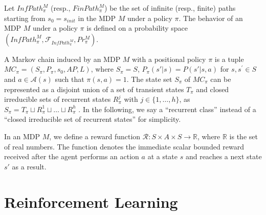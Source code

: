 \documentclass[a4j,12pt,oneside,openany,english,dvipdfmx]{jsbook}
\begin{document}
Let $InfPath^{M}_{\pi}$ (resp., $FinPath^{M}_{\pi}$) be the set of infinite (resp., finite) paths starting from $s_0=s_{init}$ in the MDP $M$ under a policy $\pi$. The behavior of an MDP $M$ under a policy $\pi$ is defined on a probability space $(InfPath^{M}_{\pi}, \mathcal{F}_{InfPath^{M}_{\pi}}, Pr^{M}_{\pi})$. %

\begin{definition}
  A Markov chain induced by an MDP $M$ with a positional policy $\pi$ is a tuple $MC_{\pi} = (S_{\pi},P_{\pi},s_0,AP,L)$, where $S_{\pi} = S$, $P_{\pi}(s'|s) = P(s'|s,a)$ for $s, s^{\prime} \in S$ and $a \in \mathcal{A}(s)$ such that $\pi(s,a) = 1$.
  The state set $S_{\pi}$ of $MC_{\pi}$ can be represented as a disjoint union of a set of transient states $T_{\pi}$ and closed irreducible sets of recurrent states $R^j_{\pi}$ with $j \in \{ 1, \ldots ,h \}$, as $ S_{\pi} = T_{\pi} \sqcup R^1_{\pi} \sqcup \ldots \sqcup R^h_{\pi} $ \cite{ESS}.
  In the following, we say a ``recurrent class'' instead of a ``closed irreducible set of recurrent states'' for simplicity.
\end{definition}

In an MDP $M$, we define a reward function $\mathcal{R}:S \times A \times S \rightarrow \mathbb{R}$, where $\mathbb{R}$ is the set of real numbers. The function denotes the immediate scalar bounded reward received after the agent performs an action $a$ at a state $s$ and reaches a next state $s'$ as a result.

\section{Reinforcement Learning}
\end{document}
